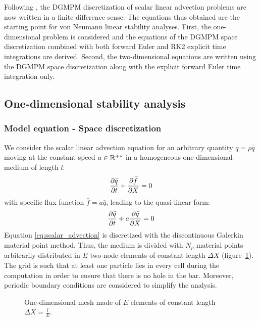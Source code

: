Following \cite{Hirsch}, the DGMPM discretization of scalar linear advection problems are now written in a finite difference sense.
The equations thus obtained are the starting point for von Neumann linear stability analyses.
First, the one-dimensional problem is considered and the equations of the DGMPM space discretization combined with both forward Euler and RK2 explicit time integrations are derived.
Second, the two-dimensional equations are written using the DGMPM space discretization along with the explicit forward Euler time integration only.

\subsection{One-dimensional stability analysis}
\label{subsec:scheme_equations}
\subsubsection*{Model equation - Space discretization}
We consider the scalar linear advection equation for an arbitrary quantity $q=\rho \bar{q}$ moving at the constant speed $a \in \mathbb{R}^{+*}$ in a homogeneous one-dimensional medium of length $l$:
\begin{equation}
\frac{\partial \bar{q}}{\partial t} + \frac{\partial \bar{f}}{\partial X} = 0 
\end{equation}
with specific flux function $\bar{f} = a\bar{q}$, leading to the quasi-linear form:
\begin{equation}
\frac{\partial \bar{q}}{\partial t} + a\frac{\partial \bar{q}}{\partial X} = 0 \label{eq:scalar_advection}
\end{equation}
Equation \eqref{eq:scalar_advection} is discretized with the discontinuous Galerkin material point method. Thus, the medium is divided with $N_p$ material points arbitrarily distributed in $E$ two-node elements of constant length $\Delta X$ (figure~\ref{fig:1Dmesh}). The grid is such that at least one particle lies in every cell during the computation in order to ensure that there is no hole in the bar. Moreover, periodic boundary conditions are considered to simplify the analysis.
\begin{figure}[h!]
  \centering
  
  \caption{One-dimensional mesh made of $E$ elements of constant length $\Delta X = \frac{l}{E}$.}\label{fig:1Dmesh}
\end{figure}

